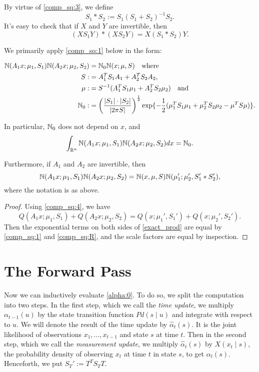 \documentclass[12pt,leqno]{article}
\begin{document}
By virtue of \eqref{comp_sq:3}, we define
$$
S_1*S_2 := S_1(S_1+S_2)^{-1}S_2.
$$
It's easy to check that if $X$ and $Y$ are invertible, then
\begin{equation}\label{comp_sq:XY}
  (XS_1Y)*(XS_2Y) = X(S_1*S_2)Y. 
\end{equation}

We primarily apply \eqref{comp_sq:1} below in the form: 
\begin{Cor}\label{comp_sq:2}
\begin{align*}
  {\mathbb N}(A_1x;\mu_1,S_1){\mathbb N}(A_2x;\mu_2,S_2) &= {\mathbb N}_0{\mathbb N}(x;\mu,S)\quad\text{where}\\
  S :&= A_1^TS_1A_1 + A_2^TS_2A_2,\\
  \mu :&= S^{-1}(A_1^TS_1\mu_1 + A_2^TS_2\mu_2)\quad\text{and} \\
  {\mathbb N}_0 :&= \left(\frac{|S_1|\cdot|S_2|}{|2\pi{S}|}\right)^{\frac{1}{2}}\exp\{-\frac{1}{2}(\mu_1^TS_1\mu_1 + \mu_2^TS_2\mu_2-\mu^TS\mu)\}.
\end{align*}

In particular, ${\mathbb N}_0$ does not depend on $x$, and
\begin{equation}\label{comp_sq:int}
  \int_{{\mathbb R}^{n}}  {\mathbb N}(A_1x;\mu_1,S_1){\mathbb N}(A_2x;\mu_2,S_2)dx = {\mathbb N}_0.
\end{equation}

Furthermore, if $A_1$ and $A_2$ are invertible, then 
\begin{equation}\label{exact_prod} 
{\mathbb N}(A_1x;\mu_1,S_1){\mathbb N}(A_2x;\mu_2,S_2)   = {\mathbb N}(x,\mu,S){\mathbb N}(\mu_1';\mu_2',S_1'*S_2'),
\end{equation}
where the notation is as above.
\begin{proof}

  Using \eqref{comp_sq:4}, we have
$$
  Q(A_1x;\mu_1,S_1) + Q(A_2x;\mu_2,S_2)  = Q(x;\mu_1',S_1') + Q(x;\mu_2',S_2').
$$
  Then the exponential terms on both sides of \eqref{exact_prod} are equal by
  \eqref{comp_sq:1} and \eqref{comp_sq:R}, and the scale factors are equal by inspection.
\end{proof}
\end{Cor}

\section{The Forward Pass}
  Now we can inductively evaluate \eqref{alpha:0}. To do so, we split the computation
  into two steps.  In the first step, which we call the {\em time update}, we multiply
  $\alpha_{t-1}(u)$ by the state transition function $Pd(s\mid u)$ and integrate with respect
  to $u$. We will denote the result of the time update by $\hat{\alpha}_t(s)$.  It is the joint 
  likelihood of observations $x_1,\dots,x_{t-1}$ and state $s$ at time $t$.
  Then in the second step, which we call the {\em measurement update}, we multiply
  $\hat{\alpha}_t(s)$ by $X(x_t \mid s)$, the probability density of observing $x_t$ at time $t$
  in state $s$, to get $\alpha_t(s)$.  Henceforth, we put $S_T' := T^TS_TT$.
\end{document}
